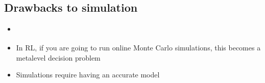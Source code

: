 \documentclass[12pt]{article}
\begin{document}
\subsection*{Drawbacks to simulation}

\begin{itemize}
\item \citep{Davis}
\item In RL, if you are going to run online Monte Carlo simulations, this becomes a metalevel decision problem \citep{Hay2012}
\item Simulations require having an accurate model
\end{itemize}

\end{document}
